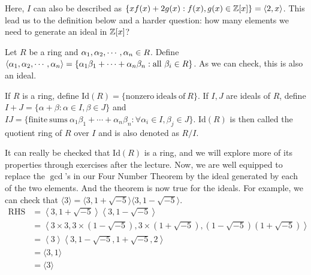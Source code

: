 \documentclass[12pt,twoside=semi,openright,numbers=noenddot]{scrbook}
\begin{document}
Here, $I$ can also be described as $\{xf(x)+2g(x):f(x), g(x)\in \mathbb Z[x]\}= \langle 2,x \rangle$. This lead us to the definition below and a harder question: how many 
elements we need to generate an ideal in $\mathbb Z[x]$?

\begin{definition}
    Let $R$ be a ring and ${\alpha}_1, {\alpha}_2, \cdots, {\alpha}_{n} \in R$. Define $\langle {\alpha}_1, {\alpha}_2, \cdots, {\alpha}_{n} \rangle = 
    \{ \alpha_1\beta_1+\cdots + \alpha_n\beta_n: \mathrm{all} \  \beta_i \in R\}$.
    As we can check, this is also an ideal.
\end{definition}

\begin{definition}
    If $R$ is a ring, define $\mathrm{Id}(R) = \{\mathrm{nonzero \ ideals \ of \ } R\}$. If $I, J$ are ideals of $R$, 
    define $I+J = \{\alpha+\beta:\alpha \in I, \beta \in J\}$ and $IJ = \{\mathrm{finite \ sums \ } \alpha_1\beta_1+\cdots+\alpha_n\beta_n: \forall \alpha_i \in I, \beta_j \in J\}$.
    $\mathrm{Id}(R)$ is then called the quotient ring of $R$ over $I$ and is also denoted as $R/I$.
\end{definition}

It can really be checked that $\mathrm{Id}(R)$ is a ring, and we will explore more of its properties through exercises after the lecture.
Now, we are well equipped to replace the $\gcd$'s in our Four Number Theorem by the ideal generated by each of the two elements. And the theorem is now true for 
the ideals. For example, we can check that $\langle 3 \rangle = \langle 3, 1+\sqrt{-5} \rangle \langle 3, 1-\sqrt{-5} \rangle$.
    \begin{align*}
        \mathrm{RHS}&= \left\langle 3, 1+\sqrt{-5} \right\rangle \left\langle 3, 1-\sqrt{-5}\right\rangle \\
        &= \left\langle 3\times 3, 3\times (1-\sqrt{-5}), 3\times(1+\sqrt{-5}), (1-\sqrt{-5})(1+\sqrt{-5})\right\rangle \\
        &= \left\langle 3\right\rangle \left\langle 3, 1-\sqrt{-5}, 1+\sqrt{-5}, 2\right\rangle \\
        &= \langle 3, 1\rangle \\
        &= \langle 3\rangle
    \end{align*}
\end{document}
